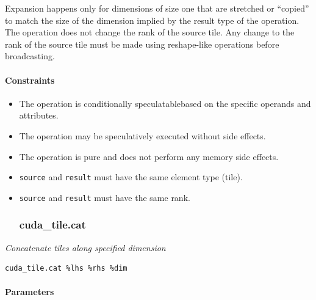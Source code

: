 \documentclass{article}
\begin{document}
Expansion happens only for dimensions of size one that are stretched or ``copied'' to match the size of the dimension implied by the result type of the operation. The operation does not change the rank of the source tile.  Any change to the rank of the source tile must be made using reshape-like operations before broadcasting.



\paragraph{Constraints}

\begin{itemize}
\item The operation is conditionally speculatablebased on the specific operands and attributes.
\item The operation may be speculatively executed without side effects.
\item The operation is pure and does not perform any memory side effects.
\item \texttt{source} and \texttt{result} must have the same element type (tile).
\item \texttt{source} and \texttt{result} must have the same rank.


\subsubsection{cuda\_tile.cat}

\end{itemize}
\textit{Concatenate tiles along specified dimension}


\begin{lstlisting}
cuda_tile.cat %lhs %rhs %dim
\end{lstlisting}

\paragraph{Parameters}
\end{document}
